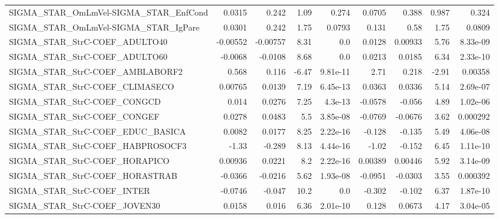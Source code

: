 \begin{tabular}{lrrrrrrrr}
SIGMA\_STAR\_OmLmVel-SIGMA\_STAR\_EnfCond  &      0.0315 &        0.242 &     1.09 &    0.274 &     0.0705 &       0.388 &        0.987 &         0.324 \\
SIGMA\_STAR\_OmLmVel-SIGMA\_STAR\_IgPare   &      0.0301 &        0.242 &     1.75 &   0.0793 &      0.131 &        0.58 &         1.75 &        0.0809 \\
SIGMA\_STAR\_StrC-COEF\_ADULTO40          &    -0.00552 &     -0.00757 &     8.31 &      0.0 &     0.0128 &     0.00933 &         5.76 &      8.33e-09 \\
SIGMA\_STAR\_StrC-COEF\_ADULTO60          &     -0.0068 &      -0.0108 &     8.68 &      0.0 &     0.0213 &      0.0185 &         6.34 &      2.33e-10 \\
SIGMA\_STAR\_StrC-COEF\_AMBLABORF2        &       0.568 &        0.116 &    -6.47 & 9.81e-11 &       2.71 &       0.218 &        -2.91 &       0.00358 \\
SIGMA\_STAR\_StrC-COEF\_CLIMASECO         &     0.00765 &       0.0139 &     7.19 & 6.45e-13 &     0.0363 &      0.0336 &         5.14 &      2.69e-07 \\
SIGMA\_STAR\_StrC-COEF\_CONGCD            &       0.014 &       0.0276 &     7.25 &  4.3e-13 &    -0.0578 &      -0.056 &         4.89 &      1.02e-06 \\
SIGMA\_STAR\_StrC-COEF\_CONGEF            &      0.0278 &       0.0483 &      5.5 & 3.85e-08 &    -0.0769 &     -0.0676 &         3.62 &      0.000292 \\
SIGMA\_STAR\_StrC-COEF\_EDUC\_BASICA       &      0.0082 &       0.0177 &     8.25 & 2.22e-16 &     -0.128 &      -0.135 &         5.49 &      4.06e-08 \\
SIGMA\_STAR\_StrC-COEF\_HABPROSOCF3       &       -1.33 &       -0.289 &     8.13 & 4.44e-16 &      -1.02 &      -0.152 &         6.45 &      1.11e-10 \\
SIGMA\_STAR\_StrC-COEF\_HORAPICO          &     0.00936 &       0.0221 &      8.2 & 2.22e-16 &    0.00389 &     0.00446 &         5.92 &      3.14e-09 \\
SIGMA\_STAR\_StrC-COEF\_HORASTRAB         &     -0.0366 &      -0.0216 &     5.62 & 1.93e-08 &    -0.0951 &     -0.0303 &         3.55 &      0.000392 \\
SIGMA\_STAR\_StrC-COEF\_INTER             &     -0.0746 &       -0.047 &     10.2 &      0.0 &     -0.302 &      -0.102 &         6.37 &      1.87e-10 \\
SIGMA\_STAR\_StrC-COEF\_JOVEN30           &      0.0158 &        0.016 &     6.36 & 2.01e-10 &      0.128 &      0.0673 &         4.17 &      3.04e-05 \\

\end{tabular}
